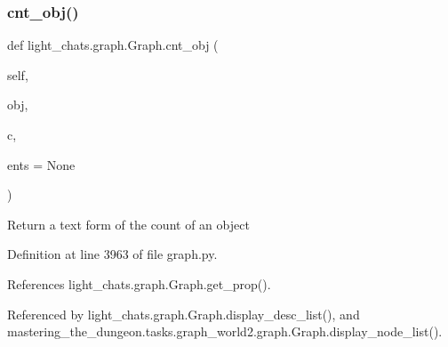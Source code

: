 \subsubsection{\texorpdfstring{cnt\+\_\+obj()}{cnt\_obj()}}
{\footnotesize\ttfamily def light\+\_\+chats.\+graph.\+Graph.\+cnt\+\_\+obj (\begin{DoxyParamCaption}\item[{}]{self,  }\item[{}]{obj,  }\item[{}]{c,  }\item[{}]{ents = {\ttfamily None} }\end{DoxyParamCaption})}

\begin{DoxyVerb}Return a text form of the count of an object\end{DoxyVerb}
 

Definition at line 3963 of file graph.\+py.



References light\+\_\+chats.\+graph.\+Graph.\+get\+\_\+prop().



Referenced by light\+\_\+chats.\+graph.\+Graph.\+display\+\_\+desc\+\_\+list(), and mastering\+\_\+the\+\_\+dungeon.\+tasks.\+graph\+\_\+world2.\+graph.\+Graph.\+display\+\_\+node\+\_\+list().

